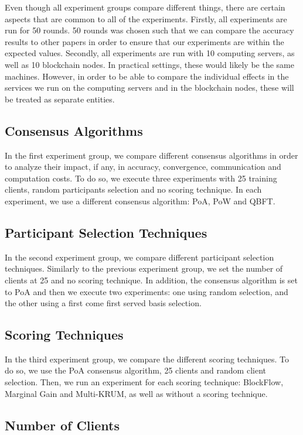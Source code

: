 Even though all experiment groups compare different things, there are certain aspects that are common to all of the experiments. Firstly, all experiments are run for 50 rounds. 50 rounds was chosen such that we can compare the accuracy results to other papers in order to ensure that our experiments are within the expected values. Secondly, all experiments are run with 10 computing servers, as well as 10 blockchain nodes. In practical settings, these would likely be the same machines. However, in order to be able to compare the individual effects in the services we run on the computing servers and in the blockchain nodes, these will be treated as separate entities.

\subsection{Consensus Algorithms}

In the first experiment group, we compare different consensus algorithms in order to analyze their impact, if any, in accuracy, convergence, communication and computation costs. To do so, we execute three experiments with 25 training clients, random participants selection and no scoring technique. In each experiment, we use a different consensus algorithm: PoA, PoW and QBFT.

\subsection{Participant Selection Techniques}

In the second experiment group, we compare different participant selection techniques. Similarly to the previous experiment group, we set the number of clients at 25 and no scoring technique. In addition, the consensus algorithm is set to PoA and then we execute two experiments: one using random selection, and the other using a first come first served basis selection.

\subsection{Scoring Techniques}

In the third experiment group, we compare the different scoring techniques. To do so, we use the PoA consensus algorithm, 25 clients and random client selection. Then, we run an experiment for each scoring technique: BlockFlow, Marginal Gain and Multi-KRUM, as well as without a scoring technique.

\subsection{Number of Clients}


